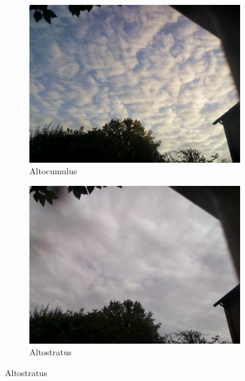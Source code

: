 \begin{figure}[h]
		\centering
		\begin{subfigure}[b]{0.31\textwidth}
		\begin{center}
				\includegraphics[width=\textwidth]{./pictures/cloudtypes/altocumulus.pdf}
		\end{center}
		\caption{Altocumulus}
		\label{fig:altostratus}
		\end{subfigure}
		\begin{subfigure}[b]{0.31\textwidth}
		\begin{center}
				\includegraphics[width=\textwidth]{./pictures/cloudtypes/altostratus.pdf}
		\end{center}
		\caption{Altostratus}

\end{subfigure}
\end{figure}
